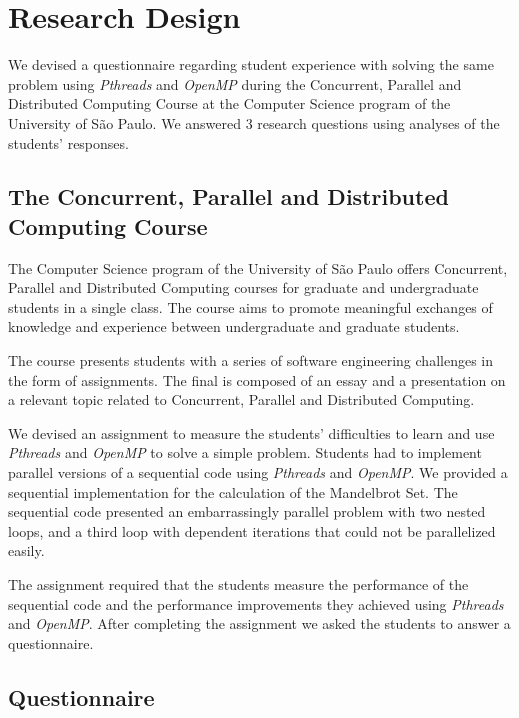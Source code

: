 \section{Research Design}
\label{sec:researchdesign}

We devised a questionnaire regarding student experience with solving the same
problem using \textit{Pthreads} and \textit{OpenMP} during the Concurrent,
Parallel and Distributed Computing Course at the Computer Science program of
the University of São Paulo. We answered 3 research questions using analyses of
the students' responses.

\subsection{The Concurrent, Parallel and Distributed Computing Course}

The Computer Science program of the University of São Paulo offers Concurrent,
Parallel and Distributed Computing courses for graduate and undergraduate
students in a single class. The course aims to promote meaningful exchanges of
knowledge and experience between undergraduate and graduate students.

The course presents students with a series of software engineering challenges
in the form of assignments. The final is composed of an essay and a
presentation on a relevant topic related to Concurrent, Parallel and
Distributed Computing.

We devised an assignment to measure the students' difficulties to
learn and use \textit{Pthreads} and \textit{OpenMP} to solve
a simple problem. Students had to implement parallel versions
of a sequential code using \textit{Pthreads} and \textit{OpenMP}.
We provided a sequential implementation for the calculation of
the Mandelbrot Set. The sequential code presented an embarrassingly
parallel problem with two nested loops, and a third loop with
dependent iterations that could not be parallelized easily.

The assignment required that the students measure the performance of the
sequential code and the performance improvements they achieved using
\textit{Pthreads} and \textit{OpenMP}. After completing the assignment we asked
the students to answer a questionnaire.

\subsection{Questionnaire}


